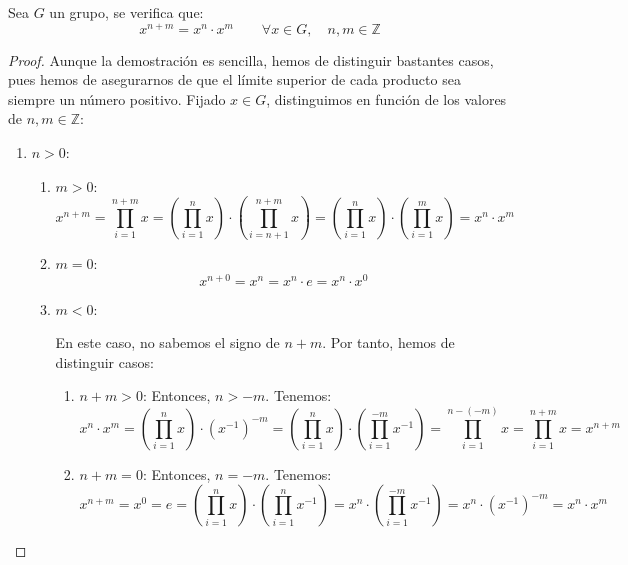 \begin{prop}
    Sea $G$ un grupo, se verifica que:
    \begin{equation*}
        x^{n+m} = x^n \cdot x^m \qquad \forall x\in G, \quad n,m\in \mathbb{Z}
    \end{equation*}
    \begin{proof} %
 Aunque la demostración es sencilla, hemos de distinguir bastantes casos, pues hemos de asegurarnos de que el límite superior de cada producto sea siempre un número positivo.
    Fijado $x\in G$, distinguimos en función de los valores de $n,m\in \mathbb{Z}$:
    \begin{enumerate}
        \item \ul{$n>0$}:
        \begin{enumerate}
            \item \ul{$m>0$}:
            \begin{equation*}
                x^{n+m} = \prod_{i=1}^{n+m} x =\left(\prod_{i=1}^n x\right) \cdot\left(\prod_{i=n+1}^{n+m} x\right)
                =\left(\prod_{i=1}^n x\right) \cdot\left(\prod_{i=1}^m x\right) = x^n \cdot x^m
            \end{equation*}

            \item \ul{$m=0$}:
            \begin{equation*}
                x^{n+0} = x^n = x^n \cdot e = x^n \cdot x^0
            \end{equation*}

            \item \ul{$m<0$}:
            
            En este caso, no sabemos el signo de $n+m$. Por tanto, hemos de distinguir casos:
            \begin{enumerate}
                \item \ul{$n+m>0$}:
                Entonces, $n>-m$. Tenemos:
                \begin{equation*}
                    x^n \cdot x^m =\left(\prod_{i=1}^n x\right) \cdot \left(x^{-1}\right)^{-m}
                    =\left(\prod_{i=1}^n x\right) \cdot\left(\prod_{i=1}^{-m} x^{-1}\right) =\prod_{i=1}^{n-(-m)} x
                    =\prod_{i=1}^{n+m} x = x^{n+m}
                \end{equation*}

                \item \ul{$n+m=0$}:
                Entonces, $n=-m$. Tenemos:
                \begin{equation*}
                    x^{n+m} = x^0 = e =\left(\prod_{i=1}^n x\right) \cdot\left(\prod_{i=1}^{n} x^{-1}\right) = x^n \cdot\left(\prod_{i=1}^{-m} x^{-1}\right) = x^n \cdot \left(x^{-1}\right)^{-m} = x^n \cdot x^m
                \end{equation*}


\end{enumerate}
\end{enumerate}
\end{enumerate}
\end{proof}
\end{prop}
